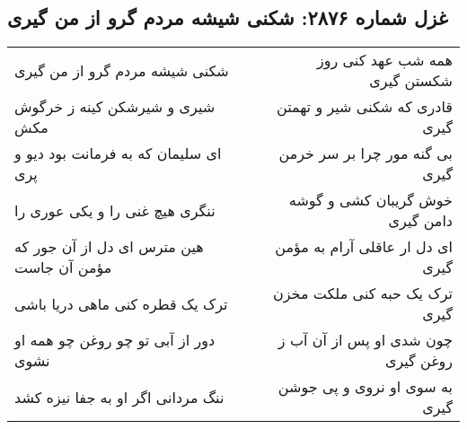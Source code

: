 \begin{center}
\section*{غزل شماره ۲۸۷۶: شکنی شیشه مردم گرو از من گیری}
\label{sec:2876}
\begin{longtable}{l p{0.5cm} r}
شکنی شیشه مردم گرو از من گیری
&&
همه شب عهد کنی روز شکستن گیری
\\
شیری و شیرشکن کینه ز خرگوش مکش
&&
قادری که شکنی شیر و تهمتن گیری
\\
ای سلیمان که به فرمانت بود دیو و پری
&&
بی گنه مور چرا بر سر خرمن گیری
\\
ننگری هیچ غنی را و یکی عوری را
&&
خوش گریبان کشی و گوشه دامن گیری
\\
هین مترس ای دل از آن جور که مؤمن آن جاست
&&
ای دل ار عاقلی آرام به مؤمن گیری
\\
ترک یک قطره کنی ماهی دریا باشی
&&
ترک یک حبه کنی ملکت مخزن گیری
\\
دور از آبی تو چو روغن چو همه او نشوی
&&
چون شدی او پس از آن آب ز روغن گیری
\\
ننگ مردانی اگر او به جفا نیزه کشد
&&
به سوی او نروی و پی جوشن گیری
\\
\end{longtable}
\end{center}

